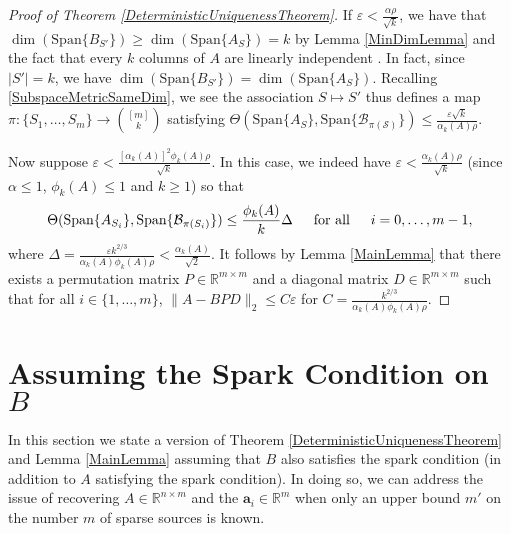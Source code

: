 \documentclass[journal, onecolumn]{IEEEtran}
\begin{document}
\begin{proof}[Proof of Theorem \ref{DeterministicUniquenessTheorem}]
If $\varepsilon < \frac{\alpha\rho}{\sqrt{k}}$, we have that $\dim(\text{Span}\{B_{S'}\}) \geq \dim(\text{Span}\{A_S\}) = k$ by Lemma \ref{MinDimLemma} and the fact that every $k$ columns of $A$ are linearly independent . In fact, since $|S'| = k$, we have $\dim(\text{Span}\{B_{S'}\}) = \dim(\text{Span}\{A_S\})$. Recalling \eqref{SubspaceMetricSameDim},  we see the association $S \mapsto S'$ thus defines a map $\pi: \{S_1, \ldots, S_m\} \to {[m] \choose k}$ satisfying $\Theta(\text{Span}\{A_S\}, \text{Span}\{\mathcal{B_{\pi(S)}}\}) \leq \frac{ \varepsilon \sqrt{k} }{ \alpha_{k}(A) \rho }$.

Now suppose $\varepsilon < \frac{[\alpha_{k}(A)]^2\phi_k(A)\rho}{\sqrt{k}}$. In this case, we indeed have $\varepsilon < \frac{\alpha_{k}(A)\rho}{\sqrt{k}}$ (since $\alpha \leq 1$, $\phi_k(A) \leq 1$ and $k \geq 1$) so that 
\begin{align}\label{SubspaceDistanceUpperBound}
\Theta(\text{Span}\{A_{S_i}\}, \text{Span}\{\mathcal{B}_{\pi(S_i)}\}) \leq \frac{\phi_k(A)}{k}\Delta
\indent \text{for all} \indent i = 0, \ldots, m-1,
\end{align}
%
where $\Delta = \frac{\varepsilon k^{2/3}}{\alpha_{k}(A)\phi_k(A)\rho} < \frac{\alpha_{k}(A)}{\sqrt{2}}$. It follows by Lemma \ref{MainLemma} that there exists a permutation matrix $P \in \mathbb{R}^{m \times m}$ and a diagonal matrix $D \in \mathbb{R}^{m \times m}$ such that for all $i \in \{1, \ldots, m\}$,
$\|A - BPD\|_2 \leq C\varepsilon$ for $C = \frac{k^{2/3}}{\alpha_{k}(A)\phi_k(A)\rho}$.
\end{proof}



\section{Assuming the Spark Condition on $B$}\label{mleqm}

In this section we state a version of Theorem \ref{DeterministicUniquenessTheorem} and Lemma \ref{MainLemma} assuming that $B$ also satisfies the spark condition (in addition to $A$ satisfying the spark condition). In doing so, we can address the issue of recovering $A \in \mathbb{R}^{n \times m}$ and the $\mathbf{a}_i \in \mathbb{R}^m$ when only an upper bound $m'$ on the number $m$ of sparse sources is known.
\end{document}
